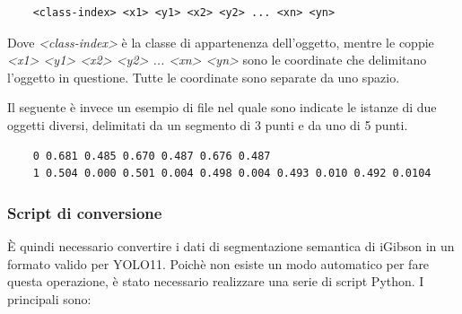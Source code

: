 \documentclass[12pt]{report}
\begin{document}
\begin{verbatim}
	<class-index> <x1> <y1> <x2> <y2> ... <xn> <yn>
\end{verbatim}

Dove \textit{<class-index>} è la classe di appartenenza dell'oggetto, mentre le coppie \textit{<x1> <y1> <x2> <y2> ... <xn> <yn>} sono le coordinate che delimitano l'oggetto in questione. Tutte le coordinate sono separate da uno spazio.

Il seguente è invece un esempio di file nel quale sono indicate le istanze di due oggetti diversi, delimitati da un segmento di 3 punti e da uno di 5 punti.

\begin{verbatim}
	0 0.681 0.485 0.670 0.487 0.676 0.487
	1 0.504 0.000 0.501 0.004 0.498 0.004 0.493 0.010 0.492 0.0104
\end{verbatim}

\subsubsection{Script di conversione}
\label{sec:script_di_conversione_igibson}

È quindi necessario convertire i dati di segmentazione semantica di iGibson in un formato valido per YOLO11. Poichè non esiste un modo automatico per fare questa operazione, è stato necessario realizzare una serie di script Python. I principali sono:
\end{document}
